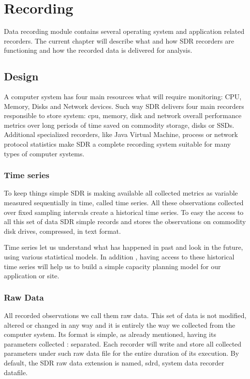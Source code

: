 \chapter{Recording}
\noindent
Data recording module contains several operating system and
application related recorders. The current chapter will describe
what and how SDR recorders are functioning and how the recorded data
is delivered for analysis.

\section{Design}
A computer system has four main resources what will require monitoring:
CPU, Memory, Disks and Network devices. Such way SDR delivers 
four main recorders responsible to store system: cpu, memory, disk 
and network overall performance metrics over long periods of time 
saved on commodity storage, disks or SSDs. Additional specialized recorders, 
like Java Virtual Machine, process or network protocol statistics make 
SDR a complete recording system suitable for many types of computer systems.

\subsection*{Time series}
To keep things simple SDR is making available all collected metrics as variable
measured sequentially in time, called time series. All these observations
collected over fixed sampling intervals create a historical time series. 
To easy the access to all this set of data SDR simple records and stores 
the observations on commodity disk drives, compressed, in text format.

Time series let us understand what has happened in past and look in the future,
using various statistical models. In addition , having access to these 
historical time series will help us to build a simple capacity planning model 
for our application or site.

\subsection*{Raw Data}
All recorded observations we call them raw data. This set of data is not 
modified, altered or changed in any way and it is entirely the way we 
collected from the computer system. Its format is simple, as already 
mentioned, having its parameters collected : separated. Each recorder will 
write and store all collected parameters under such raw data file for the 
entire duration of its execution. By default, the SDR raw data extension 
is named, sdrd, system data recorder datafile.


